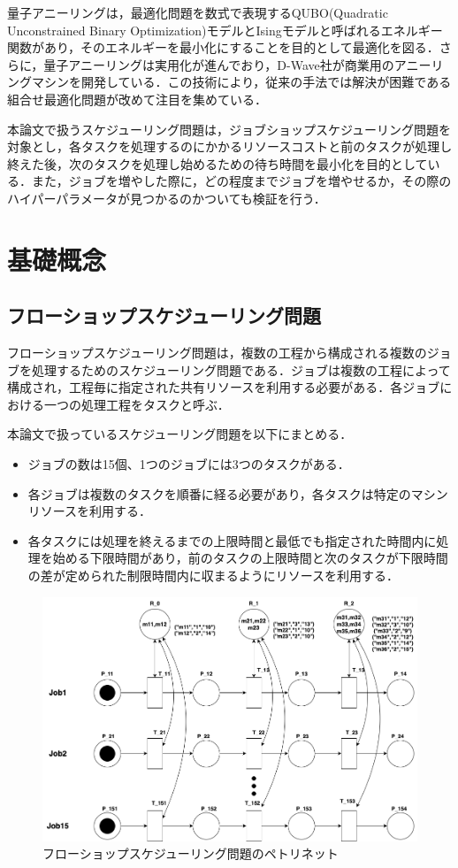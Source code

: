 \documentclass[conference]{IEEEtran}
\begin{document}
量子アニーリングは，最適化問題を数式で表現するQUBO(Quadratic Unconstrained Binary Optimization)モデルとIsingモデルと呼ばれるエネルギー関数があり，そのエネルギーを最小化にすることを目的として最適化を図る．さらに，量子アニーリングは実用化が進んでおり，D-Wave社が商業用のアニーリングマシンを開発している．この技術により，従来の手法では解決が困難である組合せ最適化問題が改めて注目を集めている．

本論文で扱うスケジューリング問題は，ジョブショップスケジューリング問題を対象とし，各タスクを処理するのにかかるリソースコストと前のタスクが処理し終えた後，次のタスクを処理し始めるための待ち時間を最小化を目的としている．また，ジョブを増やした際に，どの程度までジョブを増やせるか，その際のハイパーパラメータが見つかるのかついても検証を行う．

\section{基礎概念}
\subsection{フローショップスケジューリング問題}
フローショップスケジューリング問題は，複数の工程から構成される複数のジョブを処理するためのスケジューリング問題である．ジョブは複数の工程によって構成され，工程毎に指定された共有リソースを利用する必要がある．各ジョブにおける一つの処理工程をタスクと呼ぶ．\cite{b1}

本論文で扱っているスケジューリング問題を以下にまとめる．

\begin{itemize}
\item ジョブの数は15個、1つのジョブには3つのタスクがある．
\item 各ジョブは複数のタスクを順番に経る必要があり，各タスクは特定のマシンリソースを利用する．
\item 各タスクには処理を終えるまでの上限時間と最低でも指定された時間内に処理を始める下限時間があり，前のタスクの上限時間と次のタスクが下限時間の差が定められた制限時間内に収まるようにリソースを利用する．
\end{itemize}

\begin{figure}[htbp]
\centerline{\includegraphics[scale=0.25]{./fig/fsp.pdf}}
\caption{フローショップスケジューリング問題のペトリネット}
\label{fig1}
\end{figure}
\end{document}
